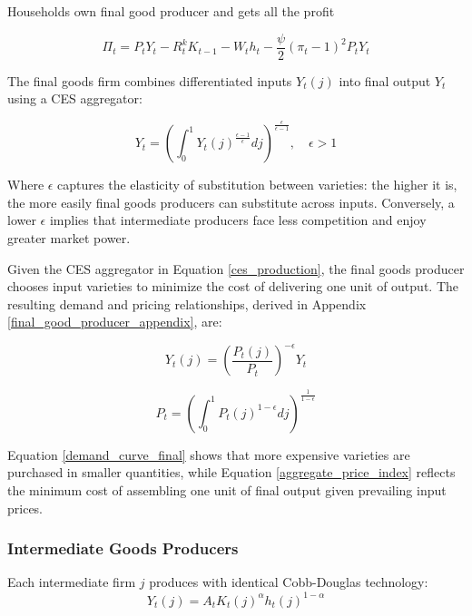 \documentclass[11pt,preprint]{elsarticle}
\numberwithin{equation}{section}
\numberwithin{figure}{section}
\numberwithin{table}{section}
\begin{document}
Households own final good producer and gets all the profit

\begin{equation}
\Pi_t = P_t Y_t - R^k_t K_{t-1} - W_t h_t - \frac{\psi}{2} (\pi_t - 1)^2 P_t Y_t
\label{final_firm_profit}
\end{equation}

The final goods firm combines differentiated inputs \(Y_t(j)\) into
final output \(Y_t\) using a CES aggregator:

\begin{equation}  
Y_t = \left( \int_0^1 Y_t(j)^{\frac{\epsilon-1}{\epsilon}}  dj \right)^{\frac{\epsilon}{\epsilon-1}}, \quad \epsilon > 1  
\label{ces_production}  
\end{equation}

Where \(\epsilon\) captures the elasticity of substitution between
varieties: the higher it is, the more easily final goods producers can
substitute across inputs. Conversely, a lower \(\epsilon\) implies that
intermediate producers face less competition and enjoy greater market
power.

Given the CES aggregator in Equation \eqref{ces_production}, the final
goods producer chooses input varieties to minimize the cost of
delivering one unit of output. The resulting demand and pricing
relationships, derived in Appendix \ref{final_good_producer_appendix},
are:

\begin{equation}  
Y_t(j) = \left( \frac{P_t(j)}{P_t} \right)^{-\epsilon} Y_t  
\label{demand_curve_final}  
\end{equation}

\begin{equation}  
P_t = \left( \int_0^1 P_t(j)^{1-\epsilon}  dj \right)^{\frac{1}{1-\epsilon}}  
\label{aggregate_price_index}  
\end{equation}

Equation \eqref{demand_curve_final} shows that more expensive varieties
are purchased in smaller quantities, while Equation
\eqref{aggregate_price_index} reflects the minimum cost of assembling
one unit of final output given prevailing input prices.

\subsubsection{Intermediate Goods
Producers}\label{intermediate-goods-producers}

Each intermediate firm \(j\) produces with identical Cobb-Douglas
technology:\\
\begin{equation}
Y_t(j) = A_t K_t(j)^{\alpha} h_t(j)^{1-\alpha}
\label{intermediate_production}
\end{equation}
\end{document}
